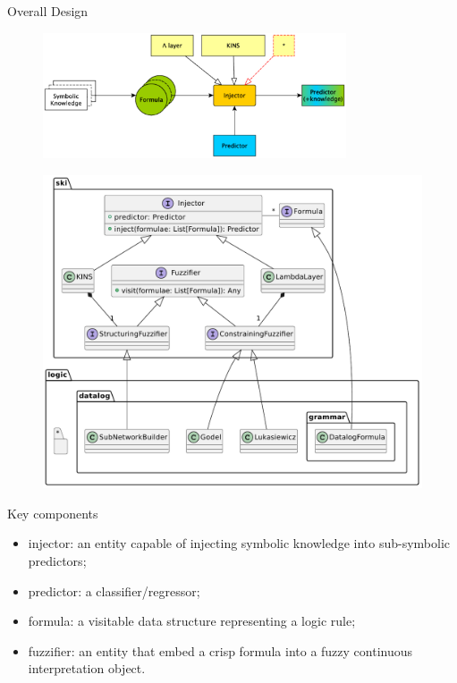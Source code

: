 \documentclass[presentation]{beamer}\mode<presentation>{\usetheme{AMSBolognaFC}}
\begin{document}
\begin{frame}[allowframebreaks]{Overall Design}
    \begin{figure}
        \centering
        \includegraphics[width=0.8\textwidth]{figures/psyki-design}
    \end{figure}
    
    \framebreak
    
    \begin{figure}
        \centering
        \includegraphics[height=0.8\textheight]{figures/psyki-class-diagram}
    \end{figure}
    
    \framebreak
    
    \begin{block}{Key components}
        \begin{itemize}
            \item\alert{injector}: an entity capable of injecting symbolic knowledge into sub-symbolic predictors;
            \item\alert{predictor}: a classifier/regressor;
            \item\alert{formula}: a visitable data structure representing a logic rule;
            \item\alert{fuzzifier}: an entity that embed a crisp formula into a fuzzy continuous interpretation object.
        \end{itemize}
    \end{block}
\end{frame}
\end{document}
